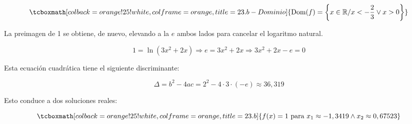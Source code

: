 \documentclass{article}
\newcommand{\hresult}[2]{\tcboxmath[colback=orange!25!white,colframe=orange, title=#1] {#2} }
\begin{document}
\begin{equation}
\hresult{23.b - Dominio}{ \mathop{\text{Dom}}(f) = \left\{ x \in \mathbb{R} / x < -\frac{2}{3} \vee x > 0 \right\} }
\end{equation}

La preimagen de 1 se obtiene, de nuevo, elevando a la $e$ ambos lados para cancelar el logaritmo natural.

\begin{equation}
1 = \ln(3x^2 + 2x) \Rightarrow e = 3x^2 + 2x \Rightarrow 3x^2 + 2x - e = 0
\end{equation}

Esta ecuación cuadrática tiene el siguiente discriminante:

\begin{equation}
\Delta = b^2 - 4ac = 2^2 - 4 \cdot 3 \cdot (-e) \approx 36,319
\end{equation}

Esto conduce a dos soluciones reales:

\begin{equation}
\hresult{23.b}{ f(x) = 1 \text{ para } x_1 \approx -1,3419 \wedge x_2 \approx 0,67523 }
\end{equation}
\end{document}
